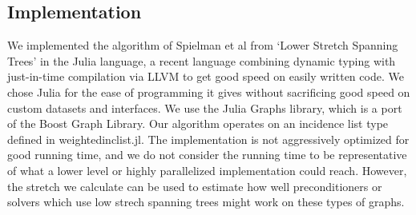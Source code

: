 \documentclass{article}
\begin{document}
\subsection*{Implementation}
We implemented the algorithm of Spielman et al from `Lower Stretch Spanning Trees' in the Julia language\cite{julia:website}, a recent language combining dynamic typing with just-in-time compilation via LLVM to get good speed on easily written code.  We chose Julia for the ease of programming it gives without sacrificing good speed on custom datasets and interfaces.  We use the Julia Graphs library\cite{julia:graphs}, which is a port of the Boost Graph Library.  Our algorithm operates on an incidence list type defined in weightedinclist.jl.  The implementation is not aggressively optimized for good running time, and we do not consider the running time to be representative of what a lower level or highly parallelized implementation could reach.  However, the stretch we calculate can be used to estimate how well preconditioners or solvers which use low strech spanning trees might work on these types of graphs.\\
\end{document}
